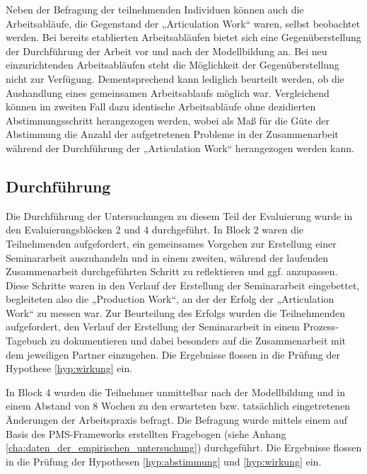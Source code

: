 Neben der Befragung der teilnehmenden Individuen können auch die Arbeitsabläufe, die Gegenstand der „Articulation Work“ waren, selbst beobachtet werden. Bei bereits etablierten Arbeitsabläufen bietet sich eine Gegenüberstellung der Durchführung der Arbeit vor und nach der Modellbildung an. Bei neu einzurichtenden Arbeitsabläufen steht die Möglichkeit der Gegenüberstellung nicht zur Verfügung. Dementsprechend kann lediglich beurteilt werden, ob die Aushandlung eines gemeinsamen Arbeitsablaufs möglich war. Vergleichend können im zweiten Fall dazu identische Arbeitsabläufe ohne dezidierten Abstimmungsschritt herangezogen werden, wobei als Maß für die Güte der Abstimmung die Anzahl der aufgetretenen Probleme in der Zusammenarbeit während der Durchführung der „Articulation Work“ herangezogen werden kann.


\subsection{Durchführung} %
\label{sub:a_durchführung}

Die Durchführung der Untersuchungen zu diesem Teil der Evaluierung wurde in den Evaluierungsblöcken 2 und 4 durchgeführt. In Block 2 waren die Teilnehmenden aufgefordert, ein gemeinsames Vorgehen zur Erstellung einer Seminararbeit auszuhandeln und in einem zweiten, während der laufenden Zusammenarbeit durchgeführten Schritt zu reflektieren und ggf. anzupassen. Diese Schritte waren in den Verlauf der Erstellung der Seminararbeit eingebettet, begleiteten also die „Production Work“, an der der Erfolg der „Articulation Work“ zu messen war. Zur Beurteilung des Erfolgs wurden die Teilnehmenden aufgefordert, den Verlauf der Erstellung der Seminararbeit in einem Prozess-Tagebuch zu dokumentieren und dabei besonders auf die Zusammenarbeit mit dem jeweiligen Partner einzugehen. Die Ergebnisse flossen in die Prüfung der Hypothese \ref{hyp:wirkung} ein.

In Block 4 wurden die Teilnehmer unmittelbar nach der Modellbildung und in einem Abstand von 8 Wochen zu den erwarteten bzw. tatsächlich eingetretenen Änderungen der Arbeitspraxis befragt. Die Befragung wurde mittels einem auf Basis des \gls{PMS}-Frameworks erstellten Fragebogen (siehe Anhang \ref{cha:daten_der_empirischen_untersuchung}) durchgeführt. Die Ergebnisse flossen in die Prüfung der Hypothesen \ref{hyp:abstimmung} und \ref{hyp:wirkung} ein.

